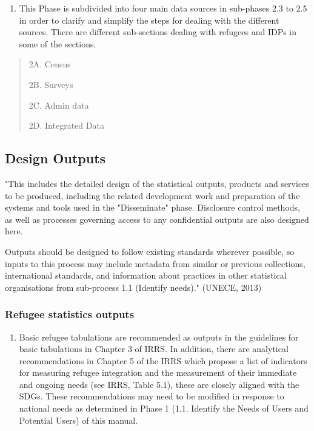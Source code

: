 \documentclass[
]{article}
\providecommand{\tightlist}{%
  \setlength{\itemsep}{0pt}\setlength{\parskip}{0pt}}
\begin{document}
\begin{enumerate}
\def\labelenumi{\arabic{enumi}.}
\setcounter{enumi}{59}
\tightlist
\item
  This Phase is subdivided into four main data sources in sub-phases
  2.3 to 2.5 in order to clarify and simplify the steps for dealing
  with the different sources. There are different sub-sections dealing
  with refugees and IDPs in some of the sections.
\end{enumerate}

\begin{quote}
2A. Census

2B. Surveys

2C. Admin data

2D. Integrated Data
\end{quote}

\hypertarget{design-outputs-1}{%
\subsection{Design Outputs}\label{design-outputs-1}}

"This includes the detailed design of the statistical outputs, products
and services to be produced, including the related development work and
preparation of the systems and tools used in the "Disseminate" phase.
Disclosure control methods, as well as processes governing access to any
confidential outputs are also designed here.

Outputs should be designed to follow existing standards wherever
possible, so inputs to this process may include metadata from similar or
previous collections, international standards, and information about
practices in other statistical organisations from sub-process 1.1
(Identify needs)." (UNECE, 2013)

\hypertarget{refugee-statistics-outputs}{%
\subsubsection{Refugee statistics outputs}\label{refugee-statistics-outputs}}

\begin{enumerate}
\def\labelenumi{\arabic{enumi}.}
\setcounter{enumi}{60}
\tightlist
\item
  Basic refugee tabulations are recommended as outputs in the
  guidelines for basic tabulations in Chapter 3 of IRRS. In addition,
  there are analytical recommendations in Chapter 5 of the IRRS which
  propose a list of indicators for measuring refugee integration and
  the measurement of their immediate and ongoing needs (see IRRS,
  Table 5.1), these are closely aligned with the SDGs. These
  recommendations may need to be modified in response to national
  needs as determined in Phase 1 (1.1. Identify the Needs of Users and
  Potential Users) of this manual.
\end{enumerate}
\end{document}
